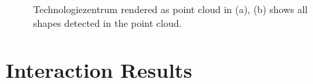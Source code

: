 \begin{figure}
\centering
{}
\caption{Technologiezentrum rendered as point cloud in (a), (b) shows all shapes detected in the point cloud. }
\label{fig:technologiezentrum_results}
\end{figure}


\section{Interaction Results}
\label{sec:interaction_results}
\todo{}






